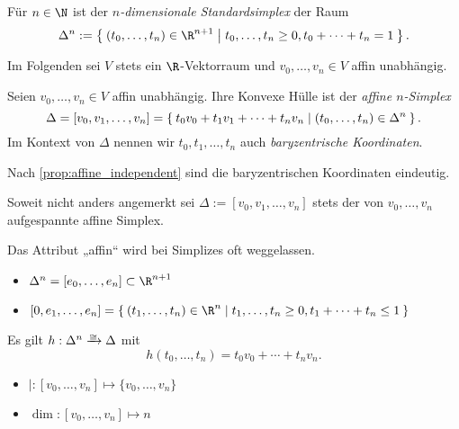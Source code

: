 \begin{df}
	Für $n \in \N$ ist der \emph{$n$-dimensionale Standardsimplex} der Raum
	\[
		\Delta^n := \Set{ (t_0, \dotsc, t_n) \in \R^{n+1} | t_0, \dotsc, t_n \ge 0, t_0 + \dotsb + t_n = 1 }.
	\]
\end{df}

\begin{conv}
	Im Folgenden sei $V$ stets ein $\R$-Vektorraum und $v_0, \dotsc, v_n \in V$ affin unabhängig.
\end{conv}

\begin{df}
	Seien $v_0, \dotsc, v_n \in V$ affin unabhängig.
	Ihre Konvexe Hülle ist der \emph{affine $n$-Simplex}
	\[
		\Delta = [v_0, v_1, \dotsc, v_n]
		= \Set{ t_0v_0 + t_1v_1 + \dotsb + t_nv_n | (t_0, \dotsc, t_n) \in \Delta^n }.
	\]
	Im Kontext von $\Delta$ nennen wir $t_0, t_1, \dotsc, t_n$ auch \emph{baryzentrische Koordinaten}.
	\begin{note}
		Nach \ref{prop:affine_independent} sind die baryzentrischen Koordinaten eindeutig.
	\end{note}
\end{df}

\begin{conv}
	Soweit nicht anders angemerkt sei $\Delta := [v_0, v_1, \dotsc, v_n]$ stets der von $v_0, \dotsc, v_n$ aufgespannte affine Simplex.

	Das Attribut „affin“ wird bei Simplizes oft weggelassen.
\end{conv}

\begin{ex}
	\begin{itemize}
		\item
			$\Delta^n = [e_0, \dotsc, e_n] \subset \R^{n+1}$
		\item
			$[0,e_1,\dotsc,e_n] = \Set{ (t_1, \dotsc, t_n) \in \R^n | t_1, \dotsc, t_n \ge 0, t_1 + \dotsb + t_n \le 1 }$
	\end{itemize}
\end{ex}

\begin{nt}
	Es gilt $h: \Delta^n \homto \Delta$ mit
	\[
		h(t_0, \dotsc, t_n) = t_0 v_0 + \dotsb + t_n v_n.
	\]
	\begin{itemize}
		\item
			$\vert: [v_0, \dotsc, v_n] \mapsto \{v_0, \dotsc, v_n\}$
		\item
			$\dim: [v_0, \dotsc, v_n] \mapsto n$
	\end{itemize}
\end{nt}

